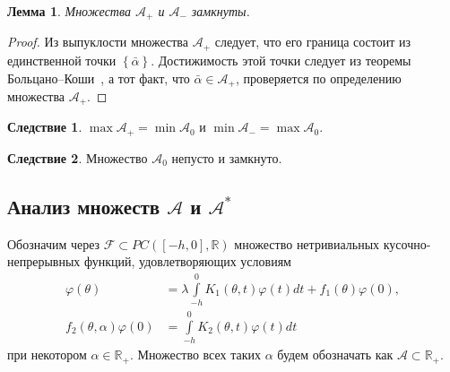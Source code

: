 \documentclass[a4paper,14pt]{article}
\newtheorem{lemma}{Лемма}
\theoremstyle{definition}
\newtheorem{corollary}{Следствие}
\begin{document}
\begin{lemma}
  Множества $\mathcal{A}_+$ и $\mathcal{A}_-$ замкнуты.
\end{lemma}

\begin{proof}
  Из выпуклости множества $\mathcal{A}_+$ следует, что его граница состоит из единственной
  точки $\left\{ \bar\alpha \right\}$. Достижимость этой точки следует из теоремы
  Больцано--Коши~\cite[стр.~188]{fihtengolc2003}, а тот факт, что
  $\bar\alpha \in \mathcal{A}_+$, проверяется по определению множества $\mathcal{A}_+$.
\end{proof}

\begin{corollary}\label{cor:minA-maxA}
  $\max \mathcal{A}_+ = \min \mathcal{A}_0$ и $\min \mathcal{A}_- = \max \mathcal{A}_0$.
\end{corollary}

\begin{corollary}\label{cor:A0-non-empty}
  Множество $\mathcal{A}_0$ непусто и замкнуто.
\end{corollary}

\subsection{Анализ множеств $\mathcal{A}$ и $\mathcal{A}^*$}

Обозначим через $\mathcal{F} \subset PC([-h, 0], \mathbb{R})$ множество нетривиальных
кусочно-непрерывных функций, удовлетворяющих условиям
\begin{align}
  \label{eq:fredholm-2}
  \varphi(\theta)
  &=
    \lambda
    \int\limits_{-h}^{0}
    K_1(\theta, t)
    \varphi(t)
    dt
    + f_1(\theta) \varphi(0), \\
  \label{eq:fredholm-1}
  f_2(\theta, \alpha) \varphi(0)
  &=
    \int\limits_{-h}^{0}
    K_2(\theta, t)
    \varphi(t)
    dt
\end{align}
при некотором $\alpha \in \mathbb{R}_+$. Множество всех таких $\alpha$ будем обозначать
как $\mathcal{A} \subset \mathbb{R}_+$.
\end{document}
